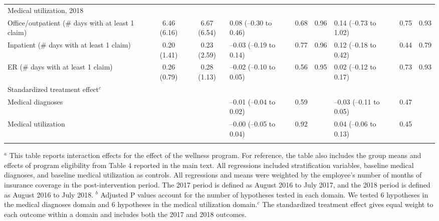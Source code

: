 \documentclass{article}
\begin{document}
\begin{landscape}
\begin{table}[tbp]
{\begin{tabularx}{\linewidth}{lCClCClCC}
Medical utilization, 2018&&&&&&&& \tabularnewline
\hspace{1em} Office/outpatient (\# days with at least 1 claim)&6.46  (6.16)&6.67  (6.54)&0.08 (--0.30 to 0.46)&0.68&0.96&0.14 (--0.73 to 1.02)&0.75&0.93 \tabularnewline
\hspace{1em} Inpatient (\# days with at least 1 claim)&0.20  (1.41)&0.23  (2.59)&--0.03 (--0.19 to 0.14)&0.77&0.96&0.12 (--0.18 to 0.42)&0.44&0.79 \tabularnewline
\hspace{1em} ER (\# days with at least 1 claim)&0.26  (0.79)&0.28  (1.13)&--0.02 (--0.10 to 0.05)&0.56&0.95&0.02 (--0.12 to 0.17)&0.73&0.93 \tabularnewline
Standardized treatment effect$^{c}$&&&&&&&& \tabularnewline
\hspace{1em} Medical diagnoses&&&--0.01 (--0.04 to 0.02)&0.59&&--0.03 (--0.11 to 0.05)&0.47& \tabularnewline
\hspace{1em} Medical utilization&&&--0.00 (--0.05 to 0.04)&0.92&&0.04 (--0.06 to 0.13)&0.45& \tabularnewline
\bottomrule \addlinespace[\belowrulesep]

\end{tabularx}
\begin{flushleft}
\tiny $^{a}$ This table reports interaction effects for the effect of the wellness program. For reference, the table also includes the group means and effects of program eligibility from Table 4 reported in the main text. All regressions included stratification variables, baseline medical diagnoses, and baseline medical utilization as controls. All regressions and means were weighted by the employee's number of months of insurance coverage in the post-intervention period. The 2017 period is defined as August 2016 to July 2017, and the 2018 period is defined as August 2016 to July 2018. \newline $^{b}$ Adjusted P values account for the number of hypotheses tested in each domain. We tested 6 hypotheses in the medical diagnoses domain and 6 hypotheses in the medical utilization domain.\newline $^{c}$ The standardized treatment effect gives equal weight to each outcome within a domain and includes both the 2017 and 2018 outcomes.
\end{flushleft}
}
\end{table}
\end{landscape}
\end{document}
